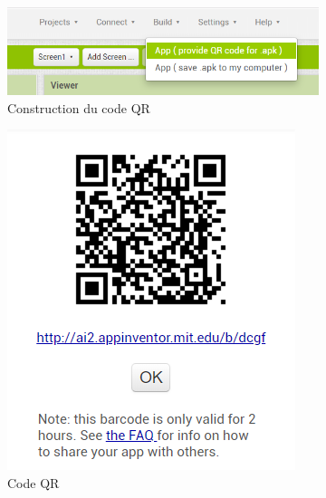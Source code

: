 \begin{figure}[h!]
    \centering

    \begin{subfigure}{0.5\linewidth}
        \centering
        \includegraphics[width=\linewidth]{img/a1/create-code-QR}
        \caption{Construction du code QR}
        \label{fig:a1-create-code-QR}
    \end{subfigure}
    \begin{subfigure}{0.2\linewidth}
        \centering
        \includegraphics[width=\linewidth]{img/a1/code-QR}
        \caption{Code QR}
        \label{fig:a1-code-QR}
    \end{subfigure}
    \begin{subfigure}{0.2\linewidth}
        \centering

\end{subfigure}
\end{figure}
